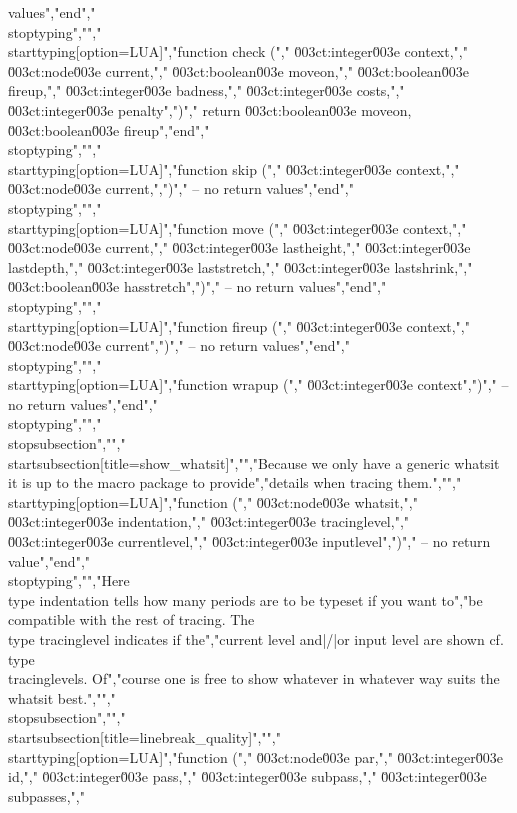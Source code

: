 values","end","\\stoptyping","","\\starttyping[option=LUA]","function check (","    \u003ct:integer\u003e context,","    \u003ct:node\u003e    current,","    \u003ct:boolean\u003e moveon,","    \u003ct:boolean\u003e fireup,","    \u003ct:integer\u003e badness,","    \u003ct:integer\u003e costs,","    \u003ct:integer\u003e penalty",")","    return \u003ct:boolean\u003e moveon, \u003ct:boolean\u003e fireup","end","\\stoptyping","","\\starttyping[option=LUA]","function skip (","    \u003ct:integer\u003e context,","    \u003ct:node\u003e    current,",")","    -- no return values","end","\\stoptyping","","\\starttyping[option=LUA]","function move (","    \u003ct:integer\u003e context,","        \u003ct:node\u003e    current,","        \u003ct:integer\u003e lastheight,","        \u003ct:integer\u003e lastdepth,","        \u003ct:integer\u003e laststretch,","        \u003ct:integer\u003e lastshrink,","        \u003ct:boolean\u003e hasstretch",")","    -- no return values","end","\\stoptyping","","\\starttyping[option=LUA]","function fireup (","    \u003ct:integer\u003e context,","    \u003ct:node\u003e current",")","    -- no return values","end","\\stoptyping","","\\starttyping[option=LUA]","function wrapup (","    \u003ct:integer\u003e context",")","    -- no return values","end","\\stoptyping","","\\stopsubsection","","\\startsubsection[title=show_whatsit]","","Because we only have a generic whatsit it is up to the macro package to provide","details when tracing them.","","\\starttyping[option=LUA]","function (","    \u003ct:node\u003e    whatsit,","    \u003ct:integer\u003e indentation,","    \u003ct:integer\u003e tracinglevel,","    \u003ct:integer\u003e currentlevel,","    \u003ct:integer\u003e inputlevel",")","    -- no return value","end","\\stoptyping","","Here \\type {indentation} tells how many periods are to be typeset if you want to","be compatible with the rest of tracing. The \\type {tracinglevel} indicates if the","current level and|/|or input level are shown cf. \\type {\\tracinglevels}. Of","course one is free to show whatever in whatever way suits the whatsit best.","","\\stopsubsection","","\\startsubsection[title=linebreak_quality]","","\\starttyping[option=LUA]","function (","    \u003ct:node\u003e    par,","    \u003ct:integer\u003e id,","    \u003ct:integer\u003e pass,","    \u003ct:integer\u003e subpass,","    \u003ct:integer\u003e subpasses,","    